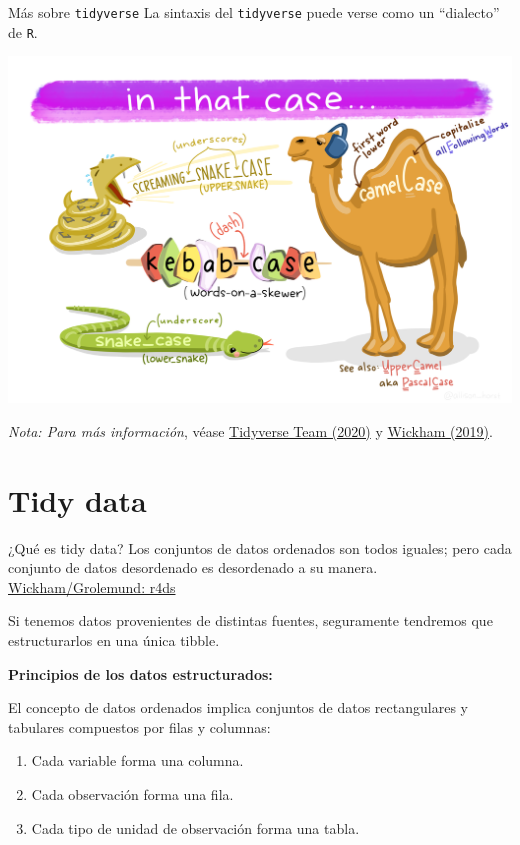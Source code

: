 \documentclass[
  ignorenonframetext,
  aspectratio=169]{beamer}
\begin{document}
\begin{frame}[fragile]{Más sobre \texttt{tidyverse}}
\protect\hypertarget{muxe1s-sobre-tidyverse-2}{}
La sintaxis del \texttt{tidyverse} puede verse como un ``dialecto'' de
\texttt{R}.

\begin{center}\includegraphics[width=0.4\linewidth]{Imgs/serpiente_camello} \end{center}

\emph{Nota: Para más información}, véase
\href{https://design.tidyverse.org/}{Tidyverse Team (2020)} y
\href{https://cran.r-project.org/web/packages/tidyverse/vignettes/manifesto.html}{Wickham
(2019)}.
\end{frame}

\hypertarget{tidy-data}{%
\section{Tidy data}\label{tidy-data}}

\begin{frame}{¿Qué es tidy data?}
\protect\hypertarget{quuxe9-es-tidy-data}{}
Los conjuntos de datos ordenados son todos iguales; pero cada conjunto
de datos desordenado es desordenado a su manera.
\href{https://r4ds.had.co.nz/tidy-data.html}{Wickham/Grolemund: r4ds}

Si tenemos datos provenientes de distintas fuentes, seguramente
tendremos que estructurarlos en una única tibble.

\textbf{Principios de los datos estructurados:}

El concepto de datos ordenados implica conjuntos de datos rectangulares
y tabulares compuestos por filas y columnas:

\begin{enumerate}
\item
  Cada variable forma una columna.
\item
  Cada observación forma una fila.
\item
  Cada tipo de unidad de observación forma una tabla.
\end{enumerate}
\end{frame}
\end{document}

